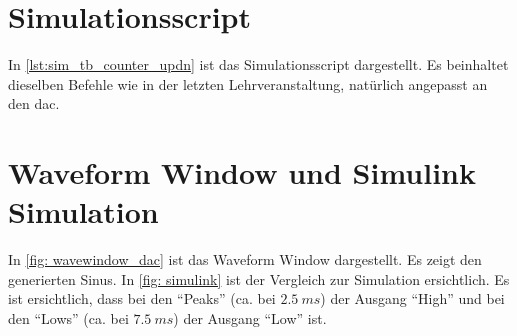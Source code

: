 \documentclass[./\jobname.tex]{subfiles}
\begin{document}
\section{Simulationsscript}
%
In \autoref{lst:sim_tb_counter_updn} ist das Simulationsscript dargestellt. Es beinhaltet dieselben Befehle wie in der letzten Lehrveranstaltung, natürlich angepasst an den \gls{dac}.
%

%
\section{Waveform Window und Simulink Simulation}
%
In \autoref{fig: wavewindow_dac} ist das Waveform Window dargestellt. Es zeigt den generierten Sinus. In \autoref{fig: simulink} ist der Vergleich zur Simulation ersichtlich. Es ist ersichtlich, dass bei den \enquote{Peaks} (ca. bei \(2.5~ms\)) der Ausgang \enquote{High} und bei den \enquote{Lows} (ca. bei \(7.5~ms\)) der Ausgang \enquote{Low} ist.
%
\begin{figure}[H]
	\centering
	\noindent{}
	\label{fig: wavewindow_dac}
\end{figure}
%
\begin{figure}[H]
	\centering
	\noindent{}
	\label{fig: simulink}
\end{figure}
%
%
%
\end{document}

